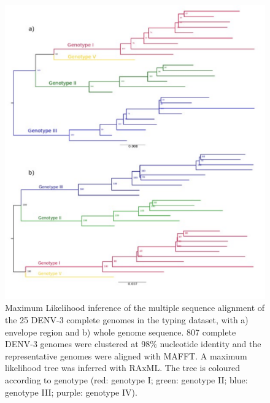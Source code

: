 \begin{figure}[h!]
\centering
\includegraphics[width=\textwidth]{figures/chapter 4/Figure S7.pdf}
\caption{Maximum Likelihood inference of the multiple sequence alignment of the 25 DENV-3 complete genomes in the typing dataset, with a) envelope region and b) whole genome sequence. 807 complete DENV-3 genomes were clustered at 98\% nucleotide identity and the representative genomes were aligned with MAFFT. A maximum likelihood tree was inferred with RAxML. The tree is coloured according to genotype (red: genotype I; green: genotype II; blue: genotype III; purple: genotype IV).}
\label{fig:chap4_figure_sup7}
\end{figure}

